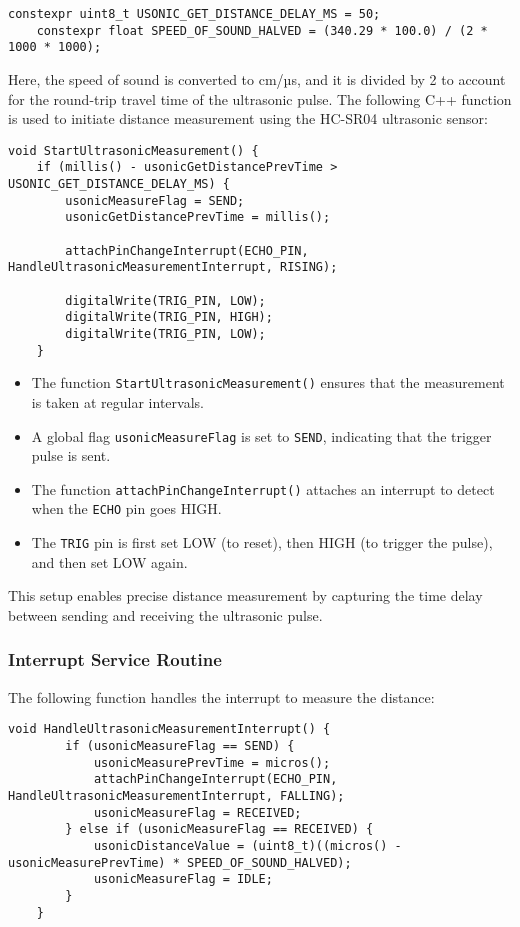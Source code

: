 \begin{lstlisting}[style=cppstyle2]
	constexpr uint8_t USONIC_GET_DISTANCE_DELAY_MS = 50;
	constexpr float SPEED_OF_SOUND_HALVED = (340.29 * 100.0) / (2 * 1000 * 1000);
\end{lstlisting}

Here, the speed of sound is converted to cm/µs, and it is divided by 2 to account for the round-trip travel time of the ultrasonic pulse. The following C++ function is used to initiate distance measurement using the HC-SR04 ultrasonic sensor:
\begin{lstlisting}[style=cppstyle2]
void StartUltrasonicMeasurement() {
	if (millis() - usonicGetDistancePrevTime > USONIC_GET_DISTANCE_DELAY_MS) {
		usonicMeasureFlag = SEND;
		usonicGetDistancePrevTime = millis();
		
		attachPinChangeInterrupt(ECHO_PIN, HandleUltrasonicMeasurementInterrupt, RISING);
		
		digitalWrite(TRIG_PIN, LOW);
		digitalWrite(TRIG_PIN, HIGH);
		digitalWrite(TRIG_PIN, LOW);
	}
\end{lstlisting}

\begin{itemize}
	\item The function \texttt{StartUltrasonicMeasurement()} ensures that the measurement is taken at regular intervals.
	\item A global flag \texttt{usonicMeasureFlag} is set to \texttt{SEND}, indicating that the trigger pulse is sent.
	\item The function \texttt{attachPinChangeInterrupt()} attaches an interrupt to detect when the \texttt{ECHO} pin goes HIGH.
	\item The \texttt{TRIG} pin is first set LOW (to reset), then HIGH (to trigger the pulse), and then set LOW again.
\end{itemize}
This setup enables precise distance measurement by capturing the time delay between sending and receiving the ultrasonic pulse.


\subsubsection{Interrupt Service Routine}
The following function handles the interrupt to measure the distance:

\begin{lstlisting}[style=cppstyle2]
	void HandleUltrasonicMeasurementInterrupt() {
		if (usonicMeasureFlag == SEND) {
			usonicMeasurePrevTime = micros();
			attachPinChangeInterrupt(ECHO_PIN, HandleUltrasonicMeasurementInterrupt, FALLING);
			usonicMeasureFlag = RECEIVED;
		} else if (usonicMeasureFlag == RECEIVED) {
			usonicDistanceValue = (uint8_t)((micros() - usonicMeasurePrevTime) * SPEED_OF_SOUND_HALVED);
			usonicMeasureFlag = IDLE;
		}
	}
\end{lstlisting}

